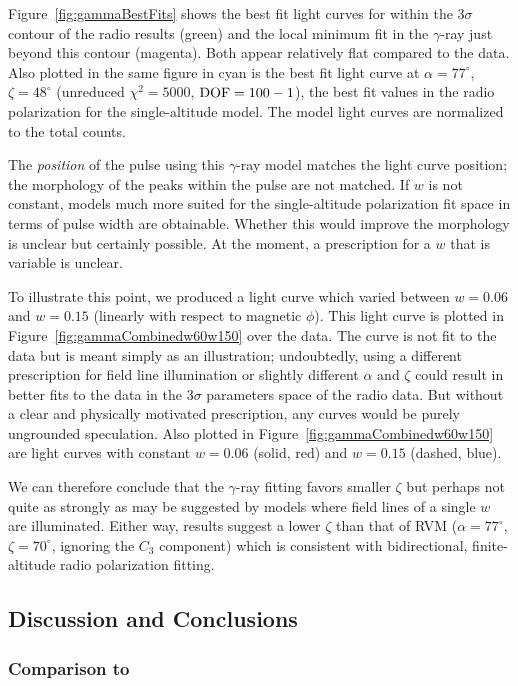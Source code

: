 Figure~\ref{fig:gammaBestFits} shows the best fit light curves
for within the $3\sigma$ contour of the radio results (green)
and the local minimum fit in the $\gamma$-ray just 
beyond this contour (magenta).  Both appear relatively 
flat compared to the data.  Also plotted in the same figure 
in cyan is the best fit light curve at $\alpha=77^\circ$, $\zeta=48^\circ$ 
(unreduced $\chi^2=5000$, $\rm{DOF}=100-1$),
the best fit values in the radio polarization for the single-altitude model. The model light curves are normalized to the total 
counts.

The \textit{position} of the pulse
using this $\gamma$-ray model 
matches the light curve position; the morphology of the 
peaks within the pulse are not matched. 
If $w$ is not constant, models much more suited for the single-altitude
polarization fit space in terms of pulse width are obtainable.  
Whether this would improve the morphology is unclear but 
certainly possible.
At the moment, a prescription
for a $w$ that is variable is unclear.

To illustrate this point, we produced a 
light curve which varied between $w=0.06$ and $w=0.15$
(linearly with respect to magnetic $\phi$).  This
light curve is plotted in Figure~\ref{fig:gammaCombinedw60w150}
over the data.  
The curve is not fit to the data but is meant simply 
as an illustration; undoubtedly, using a different prescription
for field line illumination or slightly different $\alpha$ and $\zeta$
could result in better fits to the data in the $3\sigma$ parameters
space of the radio data.  But without a
clear and physically motivated prescription, any curves would be 
purely ungrounded speculation.
Also plotted in Figure~\ref{fig:gammaCombinedw60w150}
are light curves with constant $w=0.06$ (solid, red) and $w=0.15$ (dashed, blue).

We can therefore conclude that the $\gamma$-ray 
fitting favors smaller $\zeta$ but perhaps not quite
as strongly as may be suggested by models where field lines
of a single $w$ are illuminated.  Either way, results suggest a lower $\zeta$
than that of RVM ($\alpha=77^\circ$, $\zeta=70^\circ$, ignoring the $C_3$ component) 
which is consistent with bidirectional, finite-altitude radio polarization fitting. 

\subsection{Discussion and Conclusions}
\label{sec:conclusions}

\subsubsection{Comparison to \cite{weltevrede2007main}}

